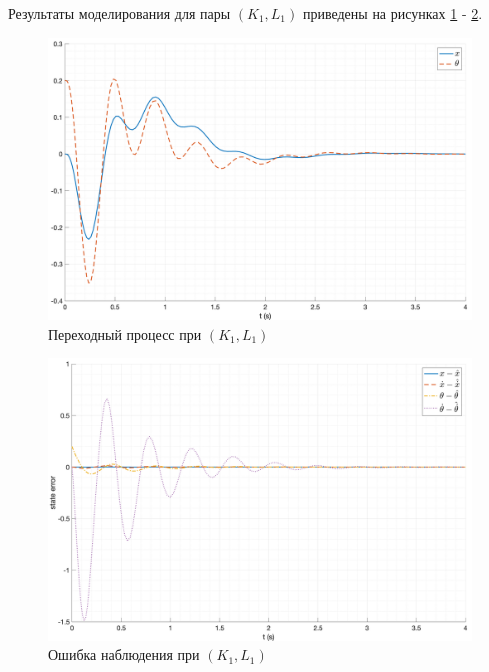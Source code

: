 Результаты моделирования для пары $(K_1, L_1)$ приведены на рисунках \ref{fig:KL_1_out} - \ref{fig:KL_1_err}. 
\begin{figure}[ht!]
    \centering
    \includegraphics[width=\textwidth]{media/plots/nonmodal_observer_controller/kl_1.png}
    \caption{Переходный процесс при $(K_1, L_1)$}
    \label{fig:KL_1_out}
\end{figure}
\begin{figure}[ht!]
    \centering
    \includegraphics[width=\textwidth]{media/plots/nonmodal_observer_controller/kl_err_1.png}
    \caption{Ошибка наблюдения при $(K_1, L_1)$}
    \label{fig:KL_1_err}
\end{figure}
\FloatBarrier

